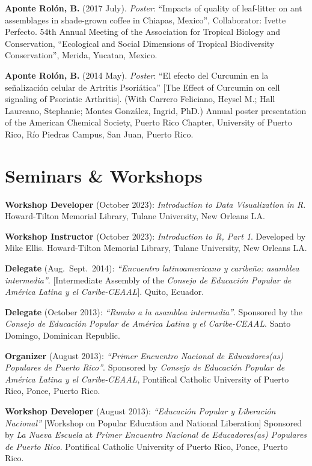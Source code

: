 \documentclass[11pt,a4paper,]{awesome-cv}
\begin{document}
\textbf{Aponte Rolón, B.} (2017 July). \emph{Poster}: ``Impacts of
quality of leaf-litter on ant assemblages in shade-grown coffee in
Chiapas, Mexico'', Collaborator: Ivette Perfecto. 54th Annual Meeting of
the Association for Tropical Biology and Conservation, ``Ecological and
Social Dimensions of Tropical Biodiversity Conservation'', Merida,
Yucatan, Mexico.

\textbf{Aponte Rolón, B.} (2014 May). \emph{Poster}: ``El efecto del
Curcumin en la señalización celular de Artritis Psoriática'' {[}The
Effect of Curcumin on cell signaling of Psoriatic Arthritis{]}. (With
Carrero Feliciano, Heysel M.; Hall Laureano, Stephanie; Montes González,
Ingrid, PhD.) Annual poster presentation of the American Chemical
Society, Puerto Rico Chapter, University of Puerto Rico, Río Piedras
Campus, San Juan, Puerto Rico.

\hypertarget{seminars-workshops}{%
\section{\texorpdfstring{ Seminars \&
Workshops}{ Seminars \& Workshops}}\label{seminars-workshops}}

\textbf{Workshop Developer} (October 2023): \emph{Introduction to Data
Visualization in R}. Howard-Tilton Memorial Library, Tulane University,
New Orleans LA.

\textbf{Workshop Instructor} (October 2023): \emph{Introduction to R,
Part 1}. Developed by Mike Ellis. Howard-Tilton Memorial Library, Tulane
University, New Orleans LA.

\textbf{Delegate} (Aug.~Sept.~2014): \emph{``Encuentro latinoamericano y
caribeño: asamblea intermedia''}. {[}Intermediate Assembly of the
\emph{Consejo de Educación Popular de América Latina y el
Caribe-CEAAL}{]}. Quito, Ecuador.

\textbf{Delegate} (October 2013): \emph{``Rumbo a la asamblea
intermedia''}. Sponsored by the \emph{Consejo de Educación Popular de
América Latina y el Caribe-CEAAL}. Santo Domingo, Dominican Republic.

\textbf{Organizer} (August 2013): \emph{``Primer Encuentro Nacional de
Educadores(as) Populares de Puerto Rico''}. Sponsored by \emph{Consejo
de Educación Popular de América Latina y el Caribe-CEAAL}, Pontifical
Catholic University of Puerto Rico, Ponce, Puerto Rico.

\textbf{Workshop Developer} (August 2013): \emph{``Educación Popular y
Liberación Nacional''} {[}Workshop on Popular Education and National
Liberation{]} Sponsored by \emph{La Nueva Escuela} at \emph{Primer
Encuentro Nacional de Educadores(as) Populares de Puerto Rico}.
Pontifical Catholic University of Puerto Rico, Ponce, Puerto Rico.
\end{document}
